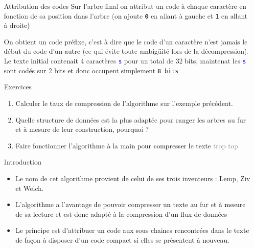 \documentclass[10pt]{beamer}
\begin{document}
\begin{frame}{\Ctitle}{\stitle}
	\begin{block}{Attribution des codes}
	Sur l'arbre final on attribut un code à chaque caractère en fonction de sa position dans l'arbre (on ajoute \textcolor{OliveGreen}{\tt 0} en allant à gauche et \textcolor{OliveGreen}{\tt 1} en allant à droite)
	\begin{center}
	 \vspace{0.7cm}
	\end{center}
	On obtient un \textcolor{BrickRed}{code préfixe}, c'est à dire que le code d'un caractère n'est jamais le début du code d'un autre (ce qui évite toute ambigüité lors de la décompression).
	Le texte initial contenait 4 caractères \textcolor{blue}{\tt s} pour un total de 32 bits, maintenat les \textcolor{blue}{\tt s} sont codés sur 2 bits et donc  occupent simplement {\tt 8 bits}
	\end{block}
\end{frame}

\begin{frame}{\Ctitle}{\stitle}
	\begin{exampleblock}{Exercices}
	\begin{enumerate}
		\item <1-> Calculer le taux de compression de l'algorithme sur l'exemple précédent.
		\item <2-> Quelle structure de données est la plus adaptée pour ranger les arbres au fur et à mesure de leur construction, pourquoi ?
		\item <3-> Faire fonctionner l'algorithme à la main pour compresser le texte \og{}\textcolor{gray}{trop top}\fg{}
	\end{enumerate}
	\end{exampleblock}
\end{frame}

\begin{frame}{\Ctitle}{\stitle}
	\begin{block}{Introduction}
		\begin{itemize}
		\item<1-> Le nom de cet algorithme provient de celui de ses trois inventeurs : Lemp, Ziv et Welch.
		\item<2-> L'algorithme a l'avantage de pouvoir compresser un texte au fur et à mesure de sa lecture et  est donc adapté à la compression d'un flux de données
		\item<3-> Le principe est d'attribuer un code aux sous chaines rencontrées dans le texte de façon à disposer d'un code compact si elles se présentent à nouveau.
		\end{itemize}
	\end{block}
\end{frame}
\end{document}
